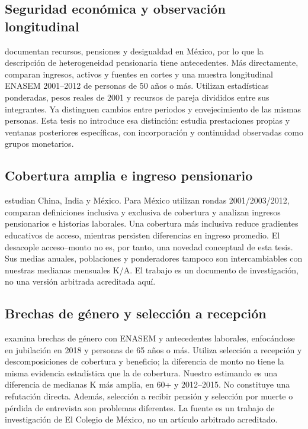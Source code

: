 \subsection{Seguridad económica y observación longitudinal}

\citet{aguila2011} documentan recursos, pensiones y desigualdad en México,
por lo que la descripción de heterogeneidad pensionaria tiene antecedentes.
Más directamente, \citet{degraff2018} comparan ingresos, activos y fuentes en
cortes y una muestra longitudinal ENASEM 2001--2012 de personas de 50 años
o más. Utilizan estadísticas ponderadas, pesos reales de 2001 y recursos de
pareja divididos entre sus integrantes. Ya distinguen cambios entre periodos
y envejecimiento de las mismas personas. Esta tesis no introduce esa distinción:
estudia prestaciones propias y ventanas posteriores específicas, con
incorporación y continuidad observadas como grupos monetarios.

\subsection{Cobertura amplia e ingreso pensionario}

\citet{perezarce2021} estudian China, India y México. Para México utilizan
rondas 2001/2003/2012, comparan definiciones inclusiva y exclusiva de cobertura
y analizan ingresos pensionarios e historias laborales. Una cobertura más
inclusiva reduce gradientes educativos de acceso, mientras persisten diferencias
en ingreso promedio. El desacople acceso--monto no es, por tanto, una novedad
conceptual de esta tesis. Sus medias anuales, poblaciones y ponderadores
tampoco son intercambiables con nuestras medianas mensuales K/A. El trabajo
es un documento de investigación, no una versión arbitrada acreditada aquí.

\subsection{Brechas de género y selección a recepción}

\citet{garciagarcia2025} examina brechas de género con ENASEM y antecedentes
laborales, enfocándose en jubilación en 2018 y personas de 65 años o más.
Utiliza selección a recepción y descomposiciones de cobertura y beneficio;
la diferencia de monto no tiene la misma evidencia estadística que la de
cobertura. Nuestro estimando es una diferencia de medianas K más amplia,
en 60+ y 2012--2015. No constituye una refutación directa. Además, selección
a recibir pensión y selección por muerte o pérdida de entrevista son
problemas diferentes. La fuente es un trabajo de investigación de El Colegio de México,
no un artículo arbitrado acreditado.


